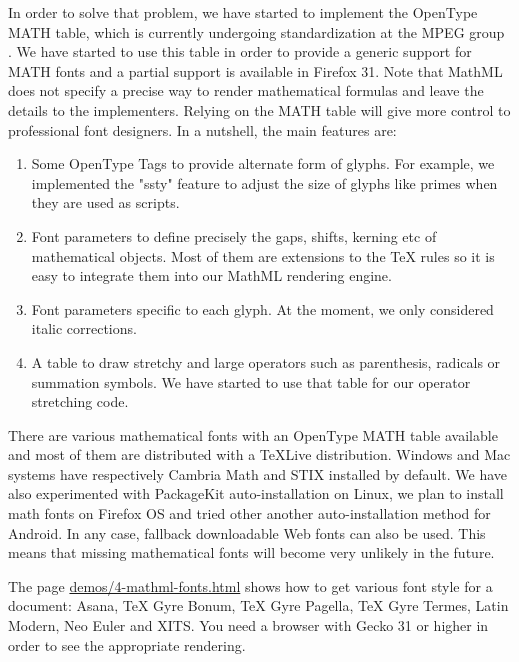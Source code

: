 In order to solve that problem, we have started to implement the
OpenType MATH table, which is currently undergoing
standardization at the MPEG group \cite{OpenTypeMATHtable}.
We have started to use this table in order to provide a generic
support for MATH fonts and a partial support is available in Firefox 31.
Note that MathML does not specify a precise way to render mathematical formulas
and leave the details to the implementers. Relying on the MATH table will give
more control to professional font designers.
In a nutshell, the main features are:

\begin{enumerate}

\item Some OpenType Tags to provide alternate form of glyphs. For example,
  we implemented the "ssty" feature to adjust the size of glyphs like primes
  when they are used as scripts.

\item Font parameters to define precisely the gaps, shifts, kerning etc of
  mathematical objects. Most of them are extensions to the TeX rules so it
  is easy to integrate them into our MathML rendering engine.

\item Font parameters specific to each glyph. At the moment, we only considered
  italic corrections.

\item A table to draw stretchy and large operators such as parenthesis,
  radicals or summation symbols. We have started to use that table for our
  operator stretching code.

\end{enumerate}

There are various mathematical fonts with an OpenType MATH table available and
most of them are distributed with a TeXLive distribution. Windows and Mac
systems have respectively Cambria Math and STIX installed by default.
We have also
experimented with PackageKit auto-installation on Linux,
we plan to install math fonts on Firefox OS and tried
other another auto-installation method for Android.
In any case, fallback downloadable Web fonts can also be used. This means that
missing mathematical fonts will become very unlikely in the future.

The page \href{http://fred-wang.github.io/MathUI2014/demos/4-mathml-fonts.html}{demos/4-mathml-fonts.html} shows how to get various font style for
a document: Asana, TeX Gyre Bonum, TeX Gyre Pagella, TeX Gyre Termes,
Latin Modern, Neo Euler and XITS. You need a browser with Gecko 31 or higher
in order to see the appropriate rendering.

